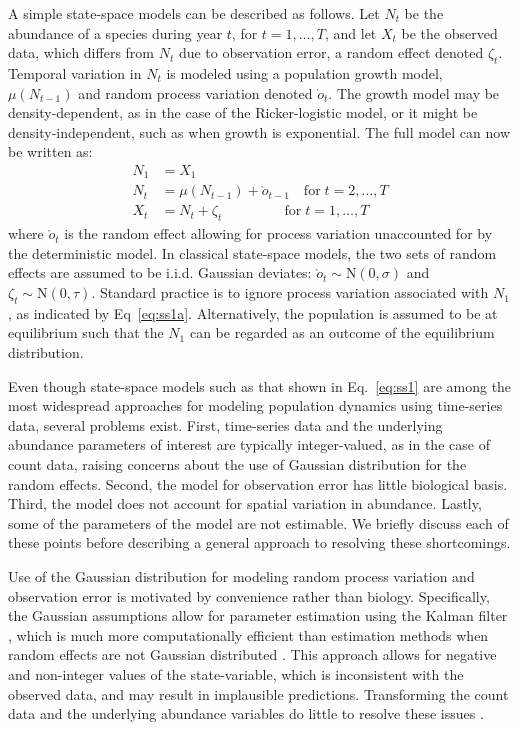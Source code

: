\documentclass[12pt]{article}
\begin{document}
A simple state-space models can be described as follows.
Let $N_t$ be the abundance of a species during year $t$, for
$t=1,\hdots,T$, and let $X_t$ be
the observed data, which differs from $N_t$ due to observation error,
a random effect denoted $\zeta_t$. Temporal variation in $N_t$ is
modeled using a population growth model, $\mu(N_{t-1})$
and random process variation denoted $\grave{o}_t$.
The growth model may be density-dependent, as in the case of the 
Ricker-logistic model, or it might be density-independent, such as when growth
is exponential.
The full model can now be written as:
\begin{subequations}
  \label{eq:ss1}
  \begin{align}
    N_1 &= X_1 \label{eq:ss1a} \\
N_t &= \mu(N_{t-1}) + \grave{o}_{t-1} \quad \text{for} \;
t=2,\hdots,T \label{eq:ss1b} \\
X_t &= N_t + \zeta_t \qquad \qquad \;\, \text{for} \;
t=1,\hdots,T \label{eq:ss1c}
  \end{align}
\end{subequations}
where $\grave{o}_t$ is the random effect allowing for process
variation unaccounted for by the deterministic model. In classical
state-space models, the two sets of random effects
are assumed to be i.i.d. Gaussian deviates:
$\grave{o}_t \sim \mathrm{N}(0, \sigma)$ and
$\zeta_t \sim \mathrm{N}(0, \tau)$. Standard practice is to
ignore process variation associated with $N_1$, as
indicated by Eq~\ref{eq:ss1a}. Alternatively, the population is
assumed to be at equilibrium such that the $N_1$ can be regarded as an
outcome of the equilibrium distribution.

Even though state-space models such as that shown in Eq.~\ref{eq:ss1}
are among the most widespread approaches for modeling population dynamics
using time-series data, several problems exist. First,
time-series data and the underlying abundance parameters of interest
are typically integer-valued, as in the case of count data, raising
concerns about the use of Gaussian distribution for the random
effects. Second, the model for observation error has little biological basis. 
Third, the model does not account for spatial variation in abundance. Lastly, some of the
parameters of the model are not estimable. We briefly discuss each of
these points before describing a general approach to resolving these
shortcomings.

Use of the Gaussian distribution for modeling random process variation
and observation error is motivated by convenience rather than
biology. Specifically, the Gaussian assumptions
allow for parameter estimation using the Kalman filter
\citep{dennis_etal:2006}, which is much more computationally efficient
than estimation methods when random effects are not Gaussian distributed
\citep{devalpine_hastings:2002}. %
This approach allows for negative and non-integer values of the state-variable, which is
inconsistent with the observed data, and may result in implausible predictions.
Transforming the count data and the underlying abundance variables do
little to resolve these issues \citep{ohara_kotze:2010}.
\end{document}
